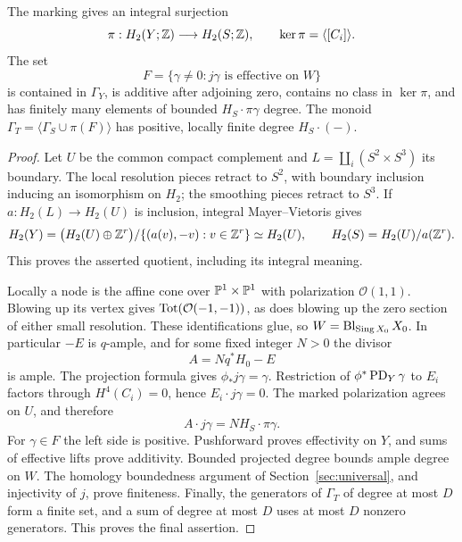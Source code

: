 \begin{proposition}\label{prop:finite}
The marking gives an integral surjection
\[
 \pi:H_2(Y;\mathbb Z)\longrightarrow H_2(S;\mathbb Z),\qquad
 \ker\pi=\langle[C_i]\rangle.
\]
The set
\begin{equation}\label{eq:F}
 F=\{\gamma\ne0:j\gamma\text{ is effective on }W\}
\end{equation}
is contained in $\Gamma_Y$, is additive after adjoining zero, contains
no class in $\ker\pi$, and has finitely many elements of bounded
$H_S\cdot\pi\gamma$ degree. The monoid
$\Gamma_T=\langle\Gamma_S\cup\pi(F)\rangle$ has positive, locally
finite degree $H_S\cdot(-)$.
\end{proposition}
\begin{proof}
Let $U$ be the common compact complement and
$L=\coprod_i(S^2\times S^3)$ its boundary. The local resolution pieces
retract to $S^2$, with boundary inclusion inducing an isomorphism on
$H_2$; the smoothing pieces retract to $S^3$. If
$a:H_2(L)\to H_2(U)$ is inclusion, integral Mayer--Vietoris gives
\[
 H_2(Y)=\bigl(H_2(U)\oplus\mathbb Z^r\bigr)/
       \{(a(v),-v):v\in\mathbb Z^r\}\simeq H_2(U),
 \qquad H_2(S)=H_2(U)/a(\mathbb Z^r).
\]
This proves the asserted quotient, including its integral meaning.

Locally a node is the affine cone over $\mathbb P^1\times\mathbb P^1$ with
polarization $\mathcal O(1,1)$. Blowing up its vertex gives
$\operatorname{Tot}(\mathcal O(-1,-1))$, as does blowing up the zero section of
either small resolution. These identifications glue, so
$W=\operatorname{Bl}_{\operatorname{Sing}X_0}X_0$. In particular $-E$ is $q$-ample,
and for some fixed integer $N>0$ the divisor
\[
 A=Nq^*H_0-E
\]
is ample. The projection formula gives $\phi_*j\gamma=\gamma$.
Restriction of $\phi^*\operatorname{PD}_Y\gamma$ to $E_i$ factors through
$H^4(C_i)=0$, hence $E_i\cdot j\gamma=0$. The marked polarization
agrees on $U$, and therefore
\begin{equation}\label{eq:ample-bound}
 A\cdot j\gamma=N H_S\cdot\pi\gamma.
\end{equation}
For $\gamma\in F$ the left side is positive. Pushforward proves
effectivity on $Y$, and sums of effective lifts prove additivity.
Bounded projected degree bounds ample degree on $W$. The homology
boundedness argument of Section~\ref{sec:universal}, and injectivity
of $j$, prove finiteness. Finally, the generators of $\Gamma_T$ of
degree at most $D$ form a finite set, and a sum of degree at most $D$
uses at most $D$ nonzero generators. This proves the final assertion.
\end{proof}

